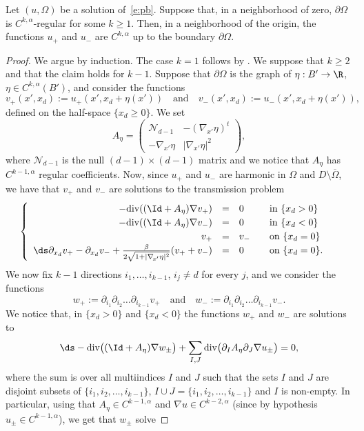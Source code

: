 \begin{lemma}\label{l:reg1}
Let $(u,\Omega)$ be a solution of~\eqref{e:pb}. Suppose that, in a neighborhood of zero, $\partial\Omega$ is $C^{k,\alpha}$-regular for some $k\ge 1$. Then, in a neighborhood of the origin, the functions $u_+$ and $u_-$ are $C^{k,\alpha}$ up to the boundary $\partial\Omega$.
\end{lemma}
\begin{proof}
We argue by induction. The case $k=1$ follows by \cite{D}. We suppose that $k\ge 2$ and that the claim holds for $k-1$.
Suppose that $\partial\Omega$ is the graph of $\eta:B'\to\R$, $\eta\in C^{k,\alpha}(B')$, and consider the functions
\[v_+(x',x_d):=u_+(x',x_d+\eta(x'))\quad\text{and}\quad v_-(x',x_d):=u_-(x',x_d+\eta(x')),\]
defined on the half-space $\{x_d\ge 0\}$.
We set
\[A_\eta=\begin{pmatrix}
\mathcal N_{d-1} & -(\nabla_{\!x'}\eta)^t\\
-\nabla_{\!x'}\eta & |\nabla_{\!x'}\eta|^2
\end{pmatrix},\]
where $\mathcal N_{d-1} $ is the null $(d-1)\times (d-1)$ matrix and we notice that $A_\eta$ has $C^{k-1,\alpha}$ regular coefficients.
Now, since $u_+$ and $u_-$ are harmonic in $\Omega$ and $D\setminus\overline\Omega$, we have that $v_+$ and $v_-$ are solutions to the transmission problem
\[\begin{cases}
\begin{array}{rcll}
-\text{div}((\Id+A_\eta)\nabla v_+)&=&0&\quad\text{in }\{x_d>0\}\\
-\text{div}((\Id+A_\eta)\nabla v_-)&=&0&\quad\text{in }\{x_d<0\}\\
v_+&=&v_-&\quad\text{on }\{x_d=0\}\\
\ds\partial_{x_d}v_+-\partial_{x_d}v_-+\frac{\beta}{2\sqrt{1+|\nabla_{\!x'}\eta|^2}}(v_++v_-)&=&0&\quad\text{on }\{x_d=0\}.
\end{array}
\end{cases}\]
We now fix $k-1$ directions $i_1,\dots,i_{k-1}$, $i_j\neq d$ for every $j$, and we consider the functions
\[w_+:=\partial_{i_1}\partial_{i_2}\dots\partial_{i_{k-1}}v_+\quad\text{and}\quad w_-:=\partial_{i_1}\partial_{i_2}\dots\partial_{i_{k-1}}v_-.\]
We notice that, in $\{x_d>0\}$ and $\{x_{d}<0\}$ the functions $w_+$ and $w_-$ are solutions to
\[
\ds-\text{div}\big((\Id+A_\eta)\nabla w_\pm\big)+\sum_{I,J}\text{div}\big(\partial_IA_\eta\partial_J\nabla u_\pm\big)=0,\]
where the sum is over all multiindices $I$ and $J$ such that the sets $I$ and $J$ are disjoint subsets of $\{i_1,i_2,\dots,i_{k-1}\}$, $I\cup J=\{i_1,i_2,\dots,i_{k-1}\}$ and $I$ is non-empty. In particular, using that $A_\eta\in C^{k-1,\alpha}$ and $\nabla u\in C^{k-2,\alpha}$ (since by hypothesis $u_\pm\in C^{k-1,\alpha}$), we get that $w_\pm$ solve

\end{proof}
